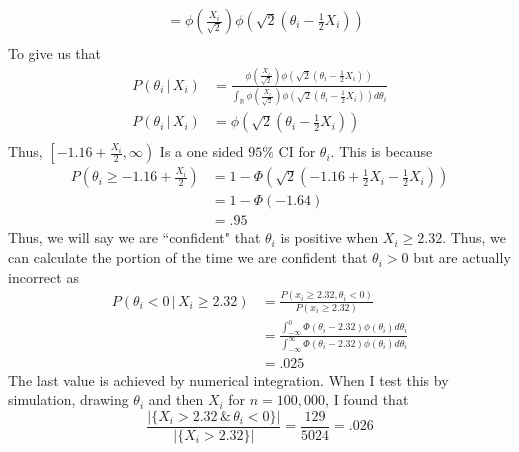 \documentclass[11pt]{article}
\newcommand{\R}{\mathbb{R}}
\theoremstyle{definition}
\begin{document}
\begin{itemize}
\begin{itemize}
\begin{align*}
                                                      &= \phi\left(\frac{X_i}{\sqrt{2}}\right)\phi\left(\sqrt{2}\left(\theta_i-\frac{1}{2}X_i\right)\right) \\
                \end{align*}
                To give us that
                \begin{align*}
                    P(\theta_i \,|\, X_i) &= \frac{\phi\left(\frac{X_i}{\sqrt{2}}\right)\phi\left(\sqrt{2}\left(\theta_i-\frac{1}{2}X_i\right)\right)}{\int_\R \phi\left(\frac{X_i}{\sqrt{2}}\right)\phi\left(\sqrt{2}\left(\theta_i-\frac{1}{2}X_i\right)\right)d\theta_i} \\
                    P(\theta_i \,|\, X_i) &= \phi\left(\sqrt{2}\left(\theta_i-\frac{1}{2}X_i\right)\right) \\
                \end{align*}
                Thus, \( \left[-1.16+\frac{X_i}{2},\infty\right)\) Is a one sided $95\%$ CI for $\theta_i$. This is because 
                \begin{align*}
                    P\left(\theta_i\geq-1.16+\frac{X_i}{2}\right) &= 1-\Phi\left(\sqrt{2}\left(-1.16+\frac{1}{2}X_i-\frac{1}{2}X_i\right)\right) \\
                                                       &=  1-\Phi\left(-1.64\right) \\
                                                       &= .95
                \end{align*}
                Thus, we will say we are ``confident" that $\theta_i$ is positive when \( X_i\geq 2.32\). Thus, we can calculate the portion of the time we are confident that $\theta_i>0$ but are actually incorrect as
                \begin{align*}
                    P(\theta_i<0 \,|\, X_i \geq 2.32) &= \frac{P(x_i \geq 2.32, \theta_i<0)}{P(x_i \geq 2.32)} \\
                                                      &= \frac{\int_{-\infty}^0 \Phi(\theta_i-2.32)\phi(\theta_i)d\theta_i}{\int_{-\infty}^\infty \Phi(\theta_i-2.32)\phi(\theta_i)d\theta_i} \\
                                                      &= .025
                \end{align*}
                The last value is achieved by numerical integration. When I test this by simulation, drawing $\theta_i$ and then $X_i$ for $n=100,000$, I found that
                \[ \frac{|\{X_i>2.32 \,\&\, \theta_i<0\}|}{|\{X_i>2.32\}|} = \frac{129}{5024} = .026 \]

\end{itemize}
\end{itemize}
\end{document}
